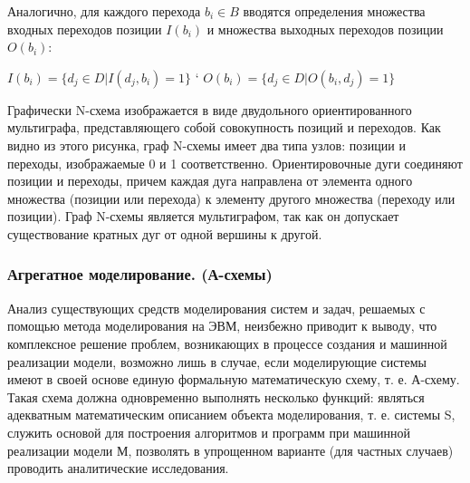 


  Аналогично, для каждого перехода $b_{i} \in B$ вводятся определения множества входных переходов позиции $I(b_{i})$ и множества выходных переходов позиции $O(b_{i})$:

  \begin{center}
    $I(b_{i}) = \{d_{j} \in D|I(d_{j}, b_{i}) = 1 \}$
    `
    $O(b_{i}) = \{d_{j} \in D|O(b_{i}, d_{j}) = 1 \}$
  \end{center}

  Графически N-схема изображается в виде двудольного ориентированного мультиграфа, представляющего собой совокупность позиций и переходов. Как видно из этого рисунка, граф N-схемы имеет два типа узлов: позиции и переходы, изображаемые 0 и 1 соответственно. Ориентировочные дуги соединяют позиции и переходы, причем каждая дуга направлена от элемента одного множества (позиции или перехода) к элементу другого множества (переходу или позиции). Граф N-схемы является мультиграфом, так как он допускает существование кратных дуг от одной вершины к другой.

\subsubsection{Агрегатное моделирование. (А-схемы)}

  Анализ существующих средств моделирования систем и задач, решаемых с помощью метода моделирования на ЭВМ, неизбежно приводит к выводу, что комплексное решение проблем, возникающих в процессе создания и машинной реализации модели, возможно лишь в случае, если моделирующие системы имеют в своей основе единую формальную математическую схему, т. е. А-схему. Такая схема должна одновременно выполнять несколько функций: являться адекватным математическим описанием объекта моделирования, т. е. системы S, служить основой для построения алгоритмов и программ при машинной реализации модели М, позволять в упрощенном варианте (для частных случаев) проводить аналитические исследования.

